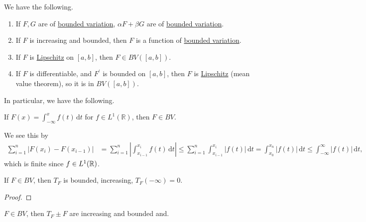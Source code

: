 \begin{remark}
	We have the following.
	\begin{enumerate}[(1)]
		\item If \(F,G\) are of \hyperref[def:bounded-variation]{bounded variation}, \(\alpha F + \beta G\) are of \hyperref[def:bounded-variation]{bounded variation}.
		\item If \(F\) is increasing and bounded, then \(F\) is a function of \hyperref[def:bounded-variation]{bounded variation}.
		\item If \(F\) is \hyperref[def:Lipschitz]{Lipschitz} on \([a,b]\), then \(F \in BV([a,b])\).
		\item If \(F\) is differentiable, and \(F^\prime\) is bounded on \([a,b]\), then \(F\) is \hyperref[def:Lipschitz]{Lipschitz} (mean value theorem), so it is in \(BV([a,b])\).
	\end{enumerate}
\end{remark}

In particular, we have the following.
\begin{remark}
	If \(F(x) = \int_{-\infty}^x f(t) \,\mathrm{d} t\) for \(f \in L^1(\mathbb{R})\), then \(F \in BV\).
\end{remark}
\begin{explanation}
	We see this by
	\[
		\begin{split}
			\sum_{i=1}^n \left\vert F(x_i) - F(x_{i-1}) \right\vert &= \sum_{i=1}^n \left\vert \int_{x_{i-1}}^{x_i} f(t) \,\mathrm{d} t \right\vert
			\leq \sum_{i=1}^n \int_{x_{i-1}}^{x_i} \left\vert f(t) \right\vert \,\mathrm{d} t
			= \int_{x_0}^{x_n} \left\vert f(t) \right\vert \,\mathrm{d} t
			\leq \int_{-\infty}^\infty \left\vert f(t) \right\vert \,\mathrm{d} t,
		\end{split}
	\]
	which is finite since \(f\in L^1(\mathbb{\MakeUppercase{r}} )\).
\end{explanation}

\begin{lemma}\label{lma:lec34-1}
	If \(F \in BV\), then \(T_F\) is bounded, increasing, \(T_F(-\infty) = 0\).
\end{lemma}
\begin{proof}
\end{proof}

\begin{lemma}\label{lma:lec34-2}
	\(F \in BV\), then \(T_F \pm F\) are increasing and bounded and.
\end{lemma}

